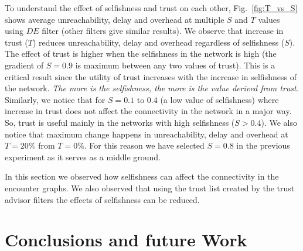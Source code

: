 \documentclass[10pt,conference]{IEEEtran}
\begin{document}
 
To understand the effect of selfishness and trust on each other, Fig.~\ref{fig:T_vs_S} shows average unreachability, delay and overhead at multiple $S$ and $T$ values using $DE$ filter (other filters give similar results). We observe that increase in trust ($T$) reduces unreachability, delay and overhead regardless of selfishness ($S$). The effect of trust is higher when the selfishness in the network is high (the gradient of $S=0.9$ is maximum between any two values of trust). This is a critical result since the utility of trust increases with the increase in selfishness of the network. \textit{The more is the selfishness, the more is the value derived from trust.} Similarly, we notice that for  $S=0.1$  to $0.4$ (a low value of selfishness) where increase in  trust does not affect the connectivity in the network in a major way. So, trust is useful mainly in the networks with high selfishness ($S > 0.4$). We also notice that maximum change happens in unreachability, delay and overhead at $T=20\%$ from $T=0\%$. 
For this reason we have selected $S=0.8$ in the previous experiment as it serves as  a middle ground.






\begin{figure*}[htp]
  \begin{center}
\renewcommand{\thesubfigure}{\Alph{subfigure}.}

    \centering
    
     
    \caption{Average Unreachability, Delay and Overhead at various values of T and S for $DE$ filter}
    \label{fig:T_vs_S}
  \end{center}	
\end{figure*}

In this section we observed how selfishness can affect the connectivity in the encounter graphs. We also observed that using the trust list created by the trust advisor filters the effects of selfishness can be reduced. 








\section{Conclusions and future Work} \label{future}
\end{document}
